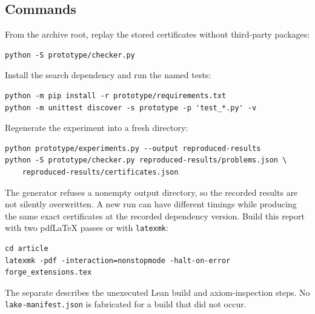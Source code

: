 \documentclass[11pt,letterpaper]{article}
\newcommand{\code}[1]{\texttt{#1}}
\theoremstyle{definition}\newtheorem{definition}[theorem]{Definition}
\theoremstyle{remark}\newtheorem{remark}[theorem]{Remark}
\begin{document}
\subsection{Commands}
From the archive root, replay the stored certificates without third-party
packages:
\par\noindent\begin{minipage}{\linewidth}
\begin{lstlisting}
python -S prototype/checker.py
\end{lstlisting}
\end{minipage}\par\smallskip
Install the search dependency and run the named tests:
\par\noindent\begin{minipage}{\linewidth}
\begin{lstlisting}
python -m pip install -r prototype/requirements.txt
python -m unittest discover -s prototype -p 'test_*.py' -v
\end{lstlisting}
\end{minipage}\par\smallskip
Regenerate the experiment into a fresh directory:
\par\noindent\begin{minipage}{\linewidth}
\begin{lstlisting}
python prototype/experiments.py --output reproduced-results
python -S prototype/checker.py reproduced-results/problems.json \
    reproduced-results/certificates.json
\end{lstlisting}
\end{minipage}\par\smallskip
The generator refuses a nonempty output directory, so the recorded results are
not silently overwritten. A new run can have different timings while producing
the same exact certificates at the recorded dependency version.
Build this report with two pdf\LaTeX{} passes or with \code{latexmk}:
\par\noindent\begin{minipage}{\linewidth}
\begin{lstlisting}
cd article
latexmk -pdf -interaction=nonstopmode -halt-on-error forge_extensions.tex
\end{lstlisting}
\end{minipage}\par\smallskip
The separate  describes the unexecuted Lean build and
axiom-inspection steps. No \code{lake-manifest.json} is fabricated for a build
that did not occur.
\end{document}
